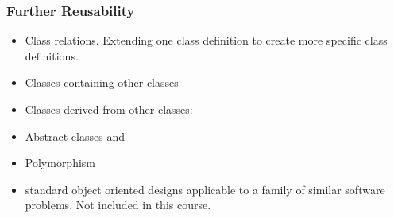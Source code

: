\begin{frame}[fragile]
\frametitle{Further Reusability}
\begin{itemize}
\item Class relations. Extending one class definition to create 
more specific class definitions.
\item Classes containing other classes
\item Classes derived from other classes: 
\item Abstract classes and 
\item Polymorphism
\item {} standard object oriented designs applicable to a
	family of similar software problems. Not included in this course.
\end{itemize}
\end{frame}



